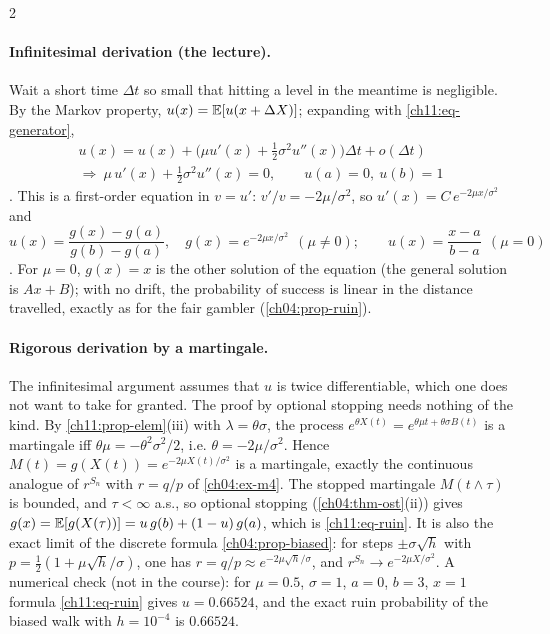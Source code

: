 \begin{paracol}{2}
\paragraph{Infinitesimal derivation (the lecture).} Wait a short time $\Delta t$ so small that hitting a level in
the meantime is negligible. By the Markov property, $u(x)=\mathbb{E}[u(x+\Delta X)]$; expanding with \eqref{ch11:eq-generator},
\begin{gather*}
  u(x)=u(x)+\bigl(\mu u'(x)+\tfrac12\sigma^2u''(x)\bigr)\Delta t+o(\Delta t)\\
  \Longrightarrow\ \mu\,u'(x)+\tfrac12\sigma^2u''(x)=0,\qquad u(a)=0,\ u(b)=1
\end{gather*}
. This is a first-order equation in $v=u'$: $v'/v=-2\mu/\sigma^2$, so $u'(x)=C\,e^{-2\mu x/\sigma^2}$ and
\begin{equation}\label{ch11:eq-ruin}
  u(x)=\frac{g(x)-g(a)}{g(b)-g(a)},\quad g(x)=e^{-2\mu x/\sigma^2}\ \ (\mu\ne0);\qquad
  u(x)=\frac{x-a}{b-a}\ \ (\mu=0)
\end{equation}
. For $\mu=0$, $g(x)=x$ is the other solution of the equation
(the general solution is $Ax+B$); with no drift, the probability of success is linear in the distance travelled, exactly as for the fair gambler
(\cref{ch04:prop-ruin}).

\paragraph{Rigorous derivation by a martingale.} The infinitesimal argument assumes that $u$ is twice differentiable, which
one does not want to take for granted. The proof by optional stopping needs nothing of the kind. By
\cref{ch11:prop-elem}(iii) with $\lambda=\theta\sigma$, the process $e^{\theta X(t)}=e^{\theta\mu t+\theta\sigma B(t)}$ is a martingale iff $\theta\mu=-\theta^2\sigma^2/2$, i.e.
$\theta=-2\mu/\sigma^2$. Hence $M(t)=g(X(t))=e^{-2\mu X(t)/\sigma^2}$ is a martingale, exactly the continuous analogue of
$r^{S_n}$ with $r=q/p$ of \cref{ch04:ex-m4}. The stopped martingale $M(t\wedge\tau)$ is bounded, and $\tau<\infty$ a.s., so
optional stopping (\cref{ch04:thm-ost}(ii)) gives $g(x)=\mathbb{E}[g(X(\tau))]=u\,g(b)+(1-u)\,g(a)$, which is \eqref{ch11:eq-ruin}. It is also the exact limit
of the discrete formula \cref{ch04:prop-biased}: for steps $\pm\sigma\sqrt h$ with $p=\tfrac12(1+\mu\sqrt h/\sigma)$, one has
$r=q/p\approx e^{-2\mu\sqrt h/\sigma}$, and $r^{S_n}\to e^{-2\mu X/\sigma^2}$. A numerical check (not in the course): for
$\mu=0.5$, $\sigma=1$, $a=0$, $b=3$, $x=1$ formula \eqref{ch11:eq-ruin} gives $u=0.66524$, and the exact ruin probability
of the biased walk with $h=10^{-4}$ is $0.66524$.


\end{paracol}

